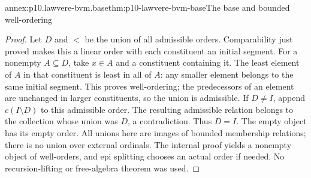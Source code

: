 \begin{annexitem}{annex:p10.lawvere-bvm.base}{thm:p10-lawvere-bvm-base}{The base and bounded well-ordering}
\begin{proof}
Let \(D\) and \(<\) be the union of all admissible orders.
Comparability just proved makes this a linear order with each constituent
an initial segment. For a nonempty \(A\subseteq D\), take
\(x\in A\) and a constituent containing it. The least element of
\(A\) in that constituent is least in all of \(A\): any smaller
element belongs to the same initial segment. This proves well-ordering;
the predecessors of an element are unchanged in larger constituents,
so the union is admissible. If \(D\ne I\), append
\(c(I\setminus D)\) to this admissible order. The resulting
admissible relation belongs to the collection whose union was \(D\),
a contradiction. Thus \(D=I\). The empty object has its empty order.
All unions here are images of bounded membership relations; there is
no union over external ordinals. The internal proof yields a nonempty
object of well-orders, and epi splitting chooses an actual order if
needed. No recursion-lifting or free-algebra theorem was used.
\end{proof}
\end{annexitem}

